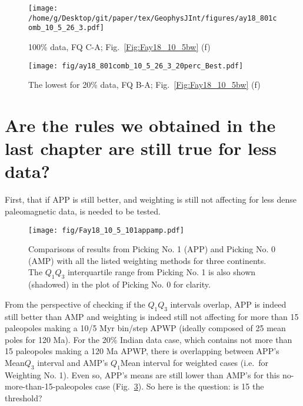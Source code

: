 \begin{figure*}[tbp]
  \captionsetup[subfigure]{labelformat=empty,aboveskip=-6pt,belowskip=-6pt}
  \centering
  \begin{subfigure}[htbp]{.49\textwidth}
    \captionsetup{skip=0pt}
    \centering
    \texttt{[image: /home/g/Desktop/git/paper/tex/GeophysJInt/figures/ay18\_801comb\_10\_5\_26\_3.pdf]}
	\caption{100\% data, FQ C-A; Fig.~\ref{Fig:Fay18_10_5bw}
	(f)}\label{Fig:Fay18_10_5w801}
  \end{subfigure}
  \begin{subfigure}[htbp]{.49\textwidth}
    \captionsetup{skip=0pt}
    \centering
    \texttt{[image: fig/ay18\_801comb\_10\_5\_26\_3\_20perc\_Best.pdf]} %
    \caption{The lowest for 20\% data, FQ B-A;
	Fig.~\ref{Fig:Fay18_10_5bw} (f)}\label{Fig:Fay18_10_5w801l20p}
  \end{subfigure}
  \caption[Less data, better similarity?]{Comparing the 100\% Australian
  120 Ma paleomagnetic data derived result with the best of the only
  20\% data derived results (the bottom green dot in Fig.~\ref{Fig:Fay18_10_5bw}
  (f)).}\label{Fig:Fay18_10_5w801l20p_vs_100p}
\end{figure*}

\section{Are the rules we obtained in the last chapter are still true for less
data?}

First, that if APP is still better, and weighting is still not affecting for
less dense paleomagnetic data, is needed to be tested.

\begin{figure}
    \centering
        \texttt{[image: fig/Fay18\_10\_5\_101appamp.pdf]}
    \captionsetup{width=1\textwidth}
    \caption{Comparisons of results from Picking No. 1 (APP) and Picking No. 0
	(AMP) with all the listed weighting methods for three continents. The
	$Q_1$\textendash$Q_3$ interquartile range from Picking No. 1 is also shown
	(shadowed) in the plot of Picking No. 0 for clarity.}\label{Fig:Fay18_10_5_101appamp}
\end{figure}

From the perspective of checking if the $Q_1$\textendash$Q_3$ intervals overlap,
APP is indeed still better than AMP and weighting is indeed still not affecting
for more than 15 paleopoles making a 10/5 Myr bin/step APWP (ideally composed of
25 mean poles for 120 Ma). For the 20\% Indian data case, which
contains not more than 15 paleopoles making a 120 Ma APWP, there is
overlapping between APP's Mean\textendash$Q_3$ interval and AMP's
$Q_1$\textendash{}Mean interval for weighted cases (i.e.\ for Weighting No.
1). Even so, APP's means are still lower than AMP's for this
no-more-than-15-paleopoles case (Fig.~\ref{Fig:Fay18_10_5_101appamp}). So here
is the question: is 15 the threshold?

